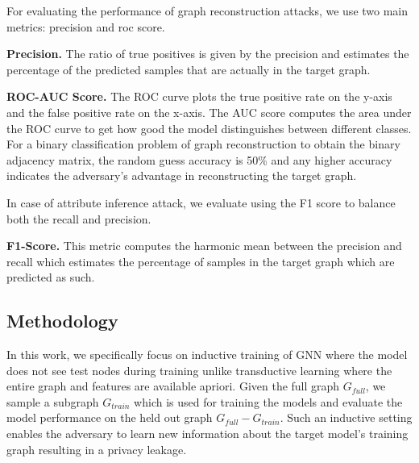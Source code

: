 
\noindent For evaluating the performance of graph reconstruction attacks, we use two main metrics: precision and roc score.

\noindent\textbf{Precision.} The ratio of true positives is given by the precision and estimates the percentage of the predicted samples that are actually in the target graph.

\noindent\textbf{ROC-AUC Score.} The ROC curve plots the true positive rate on the y-axis and the false positive rate on the x-axis. The AUC score computes the area under the ROC curve to get how good the model distinguishes between different classes.
For a binary classification problem of graph reconstruction to obtain the binary adjacency matrix, the random guess accuracy is 50\% and any higher accuracy indicates the adversary's advantage in reconstructing the target graph. %


\noindent In case of attribute inference attack, we evaluate using the F1 score to balance both the recall and precision.

\noindent\textbf{F1-Score.} This metric computes the harmonic mean between the precision and recall which estimates the percentage of samples in the target graph which are predicted as such.

\subsection{Methodology}

In this work, we specifically focus on inductive training of GNN where the model does not see test nodes during training unlike transductive learning where the entire graph and features are available apriori.
Given the full graph $G_{full}$, we sample a subgraph $G_{train}$ which is used for training the models and evaluate the model performance on the held out graph $G_{full}-G_{train}$.
Such an inductive setting enables the adversary to learn new information about the target model's training graph resulting in a privacy leakage.

